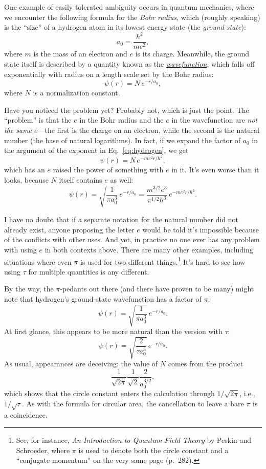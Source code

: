 One example of easily tolerated ambiguity occurs in quantum mechanics, where we encounter the following formula for the \emph{Bohr radius}, which (roughly speaking) is the ``size'' of a hydrogen atom in its lowest energy state (the \emph{ground state}):
\[
a_0 = \frac{\hbar^2}{m e^2},
\]
where $m$ is the mass of an electron and $e$ is its charge. Meanwhile, the ground state itself is described by a quantity known as the \href{https://en.wikipedia.org/wiki/Wave_function}{\emph{wavefunction}}, which falls off exponentially with radius on a length scale set by the Bohr radius:
\begin{equation}
\label{eq:hydrogen}
\psi(r) = N\,e^{-r/a_0},
\end{equation}
where $N$ is a normalization constant.

Have you noticed the problem yet? Probably not, which is just the point. The ``problem'' is that the $e$ in the Bohr radius and the $e$ in the wavefunction are \emph{not the same $e$}---the first is the charge on an electron, while the second is the natural number (the base of natural logarithms). In fact, if we expand the factor of $a_0$ in the argument of the exponent in Eq.~\eqref{eq:hydrogen}, we get
\[
\psi(r) = N\,e^{-m e^2 r/\hbar^2},
\]
which has an $e$ raised the power of something with $e$ in it. It's even worse than it looks, because $N$ itself contains $e$ as well:
\[
\psi(r) = \sqrt{\frac{1}{\pi a_0^3}}\,e^{-r/a_0} =
\frac{m^{3/2} e^3}{\pi^{1/2} \hbar^3}\,e^{-m e^2 r/\hbar^2}.
\]

I have no doubt that if a separate notation for the natural number did not already exist, anyone proposing the letter $e$ would be told it's impossible because of the conflicts with other uses. And yet, in practice no one ever has any problem with using $e$ in both contexts above.
There are many other examples, including situations where even $\pi$ is used for two different things.\footnote{See, for instance, \emph{An Introduction to Quantum Field Theory} by Peskin and Schroeder, where $\pi$ is used to denote both the circle constant and a ``conjugate momentum'' on the very same page (p.~282).} It's hard to see how using $\tau$ for multiple quantities is any different.

By the way, the $\pi$-pedants out there (and there have proven to be many) might note that hydrogen's ground-state wavefunction has a factor of $\pi$:
\[
\psi(r) = \sqrt{\frac{1}{\pi a_0^3}}\,e^{-r/a_0}.
\]
At first glance, this appears to be more natural than the version with $\tau$:
\[
\psi(r) = \sqrt{\frac{2}{\tau a_0^3}}\,e^{-r/a_0}.
\]
As usual, appearances are deceiving: the value of $N$ comes from the product
\[
\frac{1}{\sqrt{2\pi}} \frac{1}{\sqrt{2}} \frac{2}{a_0^{3/2}},
\]
which shows that the circle constant enters the calculation through $1/\sqrt{2\pi}$, i.e., $1/\sqrt{\tau}$. As with the formula for circular area, the cancellation to leave a bare $\pi$ is a coincidence.

